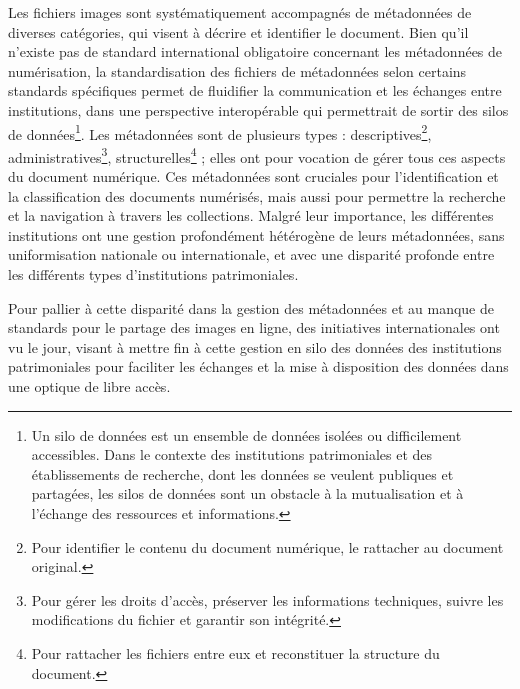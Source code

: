 	Les fichiers images sont systématiquement accompagnés de métadonnées de diverses catégories, qui visent à décrire et identifier le document. Bien qu'il n'existe pas de standard international obligatoire concernant les métadonnées de numérisation, la standardisation des fichiers de métadonnées selon certains standards spécifiques permet de fluidifier la communication et les échanges entre institutions, dans une perspective interopérable qui permettrait de sortir des silos de données\footnote{Un silo de données est un ensemble de données isolées ou difficilement accessibles. Dans le contexte des institutions patrimoniales et des établissements de recherche, dont les données se veulent publiques et partagées, les silos de données sont un obstacle à la mutualisation et à l'échange des ressources et informations.}. Les métadonnées sont de plusieurs types : descriptives\footnote{Pour identifier le contenu du document numérique, le rattacher au document original.}, administratives\footnote{Pour gérer les droits d'accès, préserver les informations techniques, suivre les modifications du fichier et garantir son intégrité.}, structurelles\footnote{Pour rattacher les fichiers entre eux et reconstituer la structure du document.} ; elles ont pour vocation de gérer tous ces aspects du document numérique. Ces métadonnées sont cruciales pour l'identification et la classification des documents numérisés, mais aussi pour permettre la recherche et la navigation à travers les collections. Malgré leur importance, les différentes institutions ont une gestion profondément hétérogène de leurs métadonnées, sans uniformisation nationale ou internationale, et avec une disparité profonde entre les différents types d'institutions patrimoniales.
	
	Pour pallier à cette disparité dans la gestion des métadonnées et au manque de standards pour le partage des images en ligne, des initiatives internationales ont vu le jour, visant à mettre fin à cette gestion en silo des données des institutions patrimoniales pour faciliter les échanges et la mise à disposition des données dans une optique de libre accès.